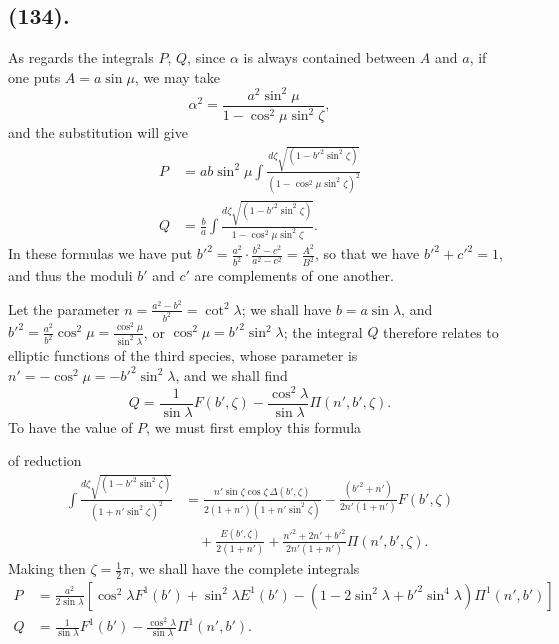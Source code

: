 \documentclass{article}
\begin{document}
\subsection*{(134).}

As regards the integrals $P$, $Q$, since $\alpha$ is always contained between $A$ and $a$, if one puts $A=a\sin\mu$, we may take
\[ \alpha^{2}=\frac{a^{2}\sin^{2}\mu}{1-\cos^{2}\mu\sin^{2}\zeta}, \]
and the substitution will give
\[ \begin{aligned} P&=ab\sin^{2}\mu\int\frac{d\zeta\sqrt{(1-b'^{2}\sin^{2}\zeta)}}{(1-\cos^{2}\mu\sin^{2}\zeta)^{2}}\\ Q&=\frac{b}{a}\int\frac{d\zeta\sqrt{(1-b'^{2}\sin^{2}\zeta)}}{1-\cos^{2}\mu\sin^{2}\zeta}. \end{aligned} \]
In these formulas we have put $b'^{2}=\frac{a^{2}}{b^{2}}\cdot\frac{b^{2}-c^{2}}{a^{2}-c^{2}}=\frac{A^{2}}{B^{2}}$, so that we have $b'^{2}+c'^{2}=1$, and thus the moduli $b'$ and $c'$ are complements of one another.

Let the parameter $n=\frac{a^{2}-b^{2}}{b^{2}}=\cot^{2}\lambda$; we shall have $b=a\sin\lambda$, and $b'^{2}=\frac{a^{2}}{b^{2}}\cos^{2}\mu=\frac{\cos^{2}\mu}{\sin^{2}\lambda}$, or $\cos^{2}\mu=b'^{2}\sin^{2}\lambda$; the integral $Q$ therefore relates to elliptic functions of the third species, whose parameter is $n'=-\cos^{2}\mu=-b'^{2}\sin^{2}\lambda$, and we shall find
\[ Q=\frac{1}{\sin\lambda}F(b',\zeta)-\frac{\cos^{2}\lambda}{\sin\lambda}\Pi(n',b',\zeta). \]
To have the value of $P$, we must first employ this formula

of reduction
\[ \begin{aligned} \int\frac{d\zeta\sqrt{(1-b'^{2}\sin^{2}\zeta)}}{(1+n'\sin^{2}\zeta)^{2}}&=\frac{n'\sin\zeta\cos\zeta\,\Delta(b',\zeta)}{2(1+n')(1+n'\sin^{2}\zeta)}-\frac{(b'^{2}+n')}{2n'(1+n')}F(b',\zeta)\\ &\quad+\frac{E(b',\zeta)}{2(1+n')}+\frac{n'^{2}+2n'+b'^{2}}{2n'(1+n')}\Pi(n',b',\zeta). \end{aligned} \]
Making then $\zeta=\frac{1}{2}\pi$, we shall have the complete integrals
\[ \begin{aligned} P&=\frac{a^{2}}{2\sin\lambda}[\cos^{2}\lambda F^{1}(b')+\sin^{2}\lambda E^{1}(b')-(1-2\sin^{2}\lambda+b'^{2}\sin^{4}\lambda)\Pi^{1}(n',b')]\\ Q&=\frac{1}{\sin\lambda}F^{1}(b')-\frac{\cos^{2}\lambda}{\sin\lambda}\Pi^{1}(n',b'). \end{aligned} \]
\end{document}
